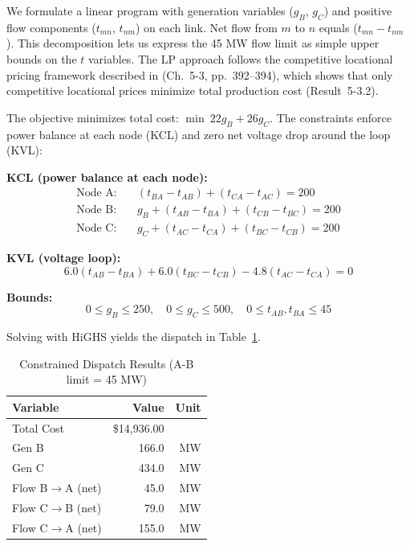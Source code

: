 \documentclass[journal, onecolumn, 12pt]{IEEEtran}
\begin{document}
We formulate a linear program with generation variables ($g_B$, $g_C$) and positive flow components ($t_{mn}$, $t_{nm}$) on each link. Net flow from $m$ to $n$ equals ($t_{mn} - t_{nm}$). This decomposition lets us express the 45 MW flow limit as simple upper bounds on the $t$ variables. The LP approach follows the competitive locational pricing framework described in \cite{stoft2002} (Ch.~5-3, pp.~392--394), which shows that only competitive locational prices minimize total production cost (Result~5-3.2).

The objective minimizes total cost: $\min\ 22g_B + 26g_C$. The constraints enforce power balance at each node (KCL) and zero net voltage drop around the loop (KVL):

\textbf{KCL (power balance at each node):}
\begin{align}
    \text{Node A:} \quad & (t_{BA} - t_{AB}) + (t_{CA} - t_{AC}) = 200 \label{eq:kcl_a}\\
    \text{Node B:} \quad & g_B + (t_{AB} - t_{BA}) + (t_{CB} - t_{BC}) = 200 \label{eq:kcl_b}\\
    \text{Node C:} \quad & g_C + (t_{AC} - t_{CA}) + (t_{BC} - t_{CB}) = 200 \label{eq:kcl_c}
\end{align}

\textbf{KVL (voltage loop):}
\begin{equation}
    6.0(t_{AB} - t_{BA}) + 6.0(t_{BC} - t_{CB}) - 4.8(t_{AC} - t_{CA}) = 0 \label{eq:kvl}
\end{equation}

\textbf{Bounds:}
\begin{equation}
    0 \leq g_B \leq 250, \quad 0 \leq g_C \leq 500, \quad 0 \leq t_{AB}, t_{BA} \leq 45
\end{equation}

Solving with HiGHS yields the dispatch in Table~\ref{tab:constrained}.

\begin{table}[h]
    \centering
    \caption{Constrained Dispatch Results (A-B limit = 45 MW)}
    \label{tab:constrained}
    \begin{tabular}{@{}lrr@{}}
    \toprule
    \textbf{Variable} & \textbf{Value} & \textbf{Unit} \\ \midrule
    Total Cost & \$14,936.00 & \\
    Gen B & 166.0 & MW \\
    Gen C & 434.0 & MW \\
    Flow B$\to$A (net) & 45.0 & MW \\
    Flow C$\to$B (net) & 79.0 & MW \\
    Flow C$\to$A (net) & 155.0 & MW \\
    \bottomrule
    \end{tabular}
\end{table}
\end{document}
